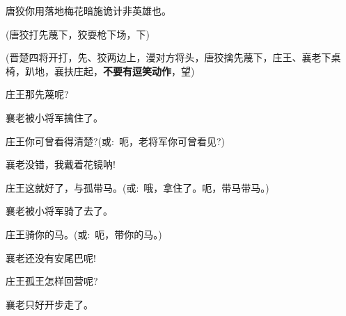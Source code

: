 {唐狡\hspace{30pt}你用落地梅花暗施诡计非英雄也。




(唐狡{\hwfs 打}先蔑{\hwfs 下}，狡{\hwfs 耍枪下场}，{\hwfs 下})


(晋楚{\hwfs 四}将{\hwfs 开打}，先、狡{\hwfs 两边上}，{\hwfs 漫对方}将{\hwfs 头}，唐狡{\hwfs 擒}先蔑{\hwfs 下}，庄王、襄老{\hwfs 下桌椅}，{\hwfs 趴地}，襄{\hwfs 扶}庄{\hwfs 起}，{\bfseries\hwfs 不要有逗笑动作}，{\hwfs 望})

庄王\hspace{30pt}那先蔑呢?

襄老\hspace{30pt}被小将军擒住了。

庄王\hspace{30pt}你可曾看得清楚?({\akai 或}:~呃，老将军你可曾看见?)

襄老\hspace{30pt}没错，我戴着花镜呐!

庄王\hspace{30pt}这就好了，与孤带马。({\akai 或}:~哦，拿住了。呃，带马带马。)

襄老\hspace{30pt}被小将军骑了去了。

庄王\hspace{30pt}骑你的马。({\akai 或}:~呃，带你的马。)

襄老\hspace{30pt}还没有安尾巴呢!

庄王\hspace{30pt}孤王怎样回营呢?

襄老\hspace{30pt}只好开步走了。

}
